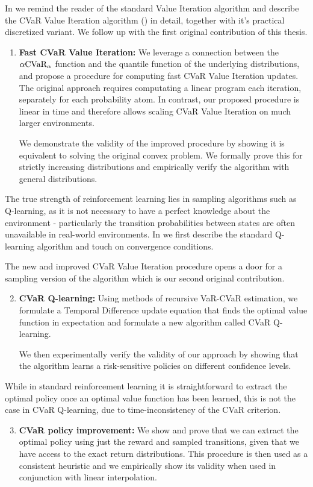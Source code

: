 In  we remind the reader of the standard Value Iteration algorithm and describe the CVaR Value Iteration algorithm (\citet{chow2015risk}) in detail, together with it's practical discretized variant. We follow up with the first original contribution of this thesis.
\begin{enumerate}
\item \textbf{Fast CVaR Value Iteration:} We leverage a connection between the $\alpha\text{CVaR}_\alpha$ function and the quantile function of the underlying distributions, and propose a procedure for computing fast CVaR Value Iteration updates. The original approach requires computating a linear program each iteration, separately for each probability atom. In contrast, our proposed procedure is linear in time and therefore allows scaling CVaR Value Iteration on much larger environments.

We demonstrate the validity of the improved procedure by showing it is equivalent to solving the original convex problem. We formally prove this for strictly increasing distributions and empirically verify the algorithm with general distributions.
\end{enumerate}

The true strength of reinforcement learning lies in sampling algorithms such as Q-learning, as it is not necessary to have a perfect knowledge about the environment - particularly the transition probabilities between states are often unavailable in real-world environments. In  we first describe the standard Q-learning algorithm and touch on convergence conditions. 

The new and improved CVaR Value Iteration procedure opens a door for a sampling version of the algorithm which is our second original contribution.
\begin{enumerate}
\setcounter{enumi}{1}
\item \textbf{CVaR Q-learning:} Using methods of recursive VaR-CVaR estimation, we formulate a Temporal Difference update equation that finds the optimal value function in expectation and formulate a new algorithm called CVaR Q-learning. 

We then experimentally verify the validity of our approach by showing that the algorithm learns a risk-sensitive policies on different confidence levels.
\end{enumerate}

While in standard reinforcement learning it is straightforward to extract the optimal policy once an optimal value function has been learned, this is not the case in CVaR Q-learning, due to time-inconsistency of the CVaR criterion.
\begin{enumerate}
\setcounter{enumi}{2}
\item \textbf{CVaR policy improvement:} We show and prove that we can extract the optimal policy using just the reward and sampled transitions, given that we have access to the exact return distributions. This procedure is then used as a consistent heuristic and we empirically show its validity when used in conjunction with linear interpolation. 
\end{enumerate}

